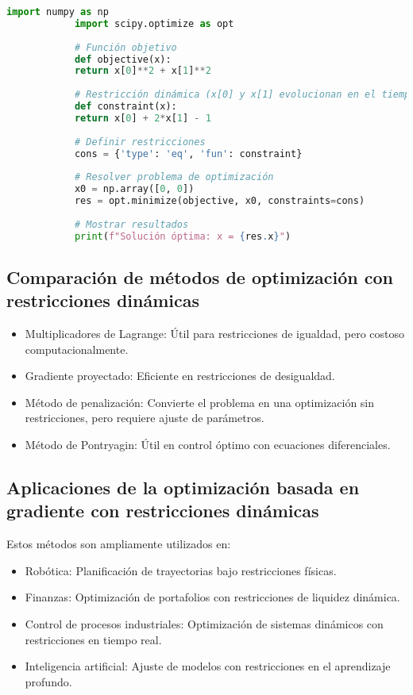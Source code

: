 \begin{itemize}
		\begin{lstlisting}[language=Python, caption={Optimización con restricciones dinámicas en Python}]
			import numpy as np
			import scipy.optimize as opt
			
			# Función objetivo
			def objective(x):
			return x[0]**2 + x[1]**2
			
			# Restricción dinámica (x[0] y x[1] evolucionan en el tiempo)
			def constraint(x):
			return x[0] + 2*x[1] - 1
			
			# Definir restricciones
			cons = {'type': 'eq', 'fun': constraint}
			
			# Resolver problema de optimización
			x0 = np.array([0, 0])
			res = opt.minimize(objective, x0, constraints=cons)
			
			# Mostrar resultados
			print(f"Solución óptima: x = {res.x}")
		\end{lstlisting}
		
		\subsection{Comparación de métodos de optimización con restricciones dinámicas}
		
		\begin{itemize}
			\item Multiplicadores de Lagrange: Útil para restricciones de igualdad, pero costoso computacionalmente.
			\item Gradiente proyectado: Eficiente en restricciones de desigualdad.
			\item Método de penalización: Convierte el problema en una optimización sin restricciones, pero requiere ajuste de parámetros.
			\item Método de Pontryagin: Útil en control óptimo con ecuaciones diferenciales.
		\end{itemize}
		
		\subsection{Aplicaciones de la optimización basada en gradiente con restricciones dinámicas}
		
		Estos métodos son ampliamente utilizados en:
		
		\begin{itemize}
			\item Robótica: Planificación de trayectorias bajo restricciones físicas.
			\item Finanzas: Optimización de portafolios con restricciones de liquidez dinámica.
			\item Control de procesos industriales: Optimización de sistemas dinámicos con restricciones en tiempo real.
			\item Inteligencia artificial: Ajuste de modelos con restricciones en el aprendizaje profundo.
		\end{itemize}

\end{itemize}
